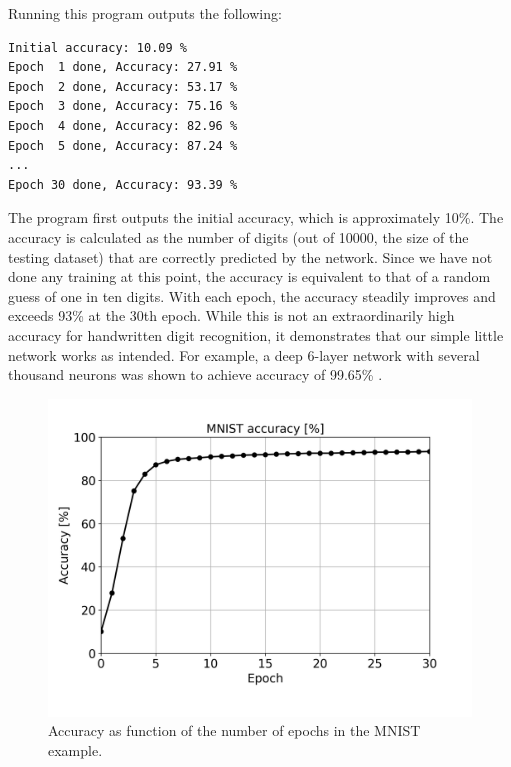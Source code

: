 \documentclass[sigplan, review=false, screen=true, balance=true]{acmart}
\begin{document}
Running this program outputs the following:

\begin{minipage}{\linewidth}
\begin{lstlisting}[caption={Output from the MNIST training example program. Some lines omitted for brevity.}, captionpos=b]
Initial accuracy: 10.09 %
Epoch  1 done, Accuracy: 27.91 %
Epoch  2 done, Accuracy: 53.17 %
Epoch  3 done, Accuracy: 75.16 %
Epoch  4 done, Accuracy: 82.96 %
Epoch  5 done, Accuracy: 87.24 %
...
Epoch 30 done, Accuracy: 93.39 %
\end{lstlisting}
\end{minipage}

The program first outputs the initial accuracy, which is approximately 10\%.
The accuracy is calculated as the number of digits (out of 10000, the size
of the testing dataset) that are correctly predicted by the network.
Since we have not done any training at this point, the accuracy is equivalent
to that of a random guess of one in ten digits. With each epoch, the accuracy
steadily improves and exceeds 93\% at the 30th epoch. While this is not an
extraordinarily high accuracy for handwritten digit recognition, it demonstrates
that our simple little network works as intended. For example, a deep 6-layer
network with several thousand neurons was shown to achieve accuracy of
99.65\% \citep{ciresan10}.

\begin{figure}[H]
  \centering
  \includegraphics[width=\columnwidth]{../figures/mnist_accuracy.png}
  \caption{Accuracy as function of the number of epochs in the MNIST example.}
  \label{fig_mnist_accuracy}
\end{figure}
\end{document}
